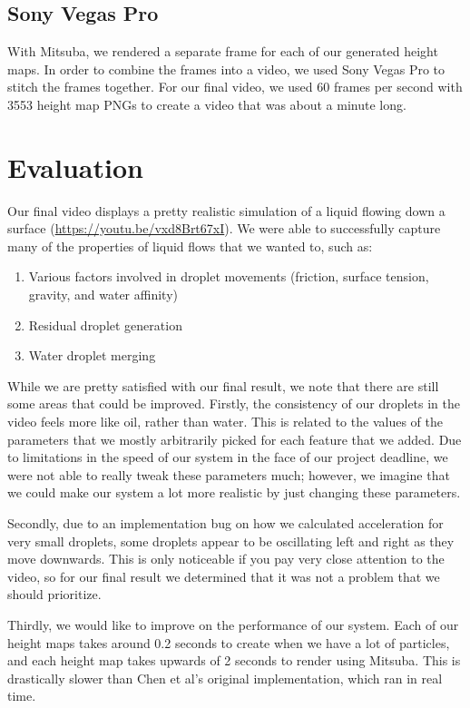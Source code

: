 \documentclass[10pt,twocolumn,letterpaper]{article}
\begin{document}
\subsection{Sony Vegas Pro}

With Mitsuba, we rendered a separate frame for each of our generated height maps. In order to combine the frames into a video, we used Sony Vegas Pro to stitch the frames together. For our final video, we used 60 frames per second with 3553 height map PNGs to create a video that was about a minute long.


\section{Evaluation}

Our final video displays a pretty realistic simulation of a liquid flowing down a surface (\url{https://youtu.be/vxd8Brt67xI}). We were able to successfully capture many of the properties of liquid flows that we wanted to, such as:

\begin{enumerate}
    \item Various factors involved in droplet movements (friction, surface tension, gravity, and water affinity)
    \item Residual droplet generation
    \item Water droplet merging
\end{enumerate}

While we are pretty satisfied with our final result, we note that there are still some areas that could be improved. Firstly, the consistency of our droplets in the video feels more like oil, rather than water. This is related to the values of the parameters that we mostly arbitrarily picked for each feature that we added. Due to limitations in the speed of our system in the face of our project deadline, we were not able to really tweak these parameters much; however, we imagine that we could make our system a lot more realistic by just changing these parameters.

Secondly, due to an implementation bug on how we calculated acceleration for very small droplets, some droplets appear to be oscillating left and right as they move downwards. This is only noticeable if you pay very close attention to the video, so for our final result we determined that it was not a problem that we should prioritize.

Thirdly, we would like to improve on the performance of our system. Each of our height maps takes around 0.2 seconds to create when we have a lot of particles, and each height map takes upwards of 2 seconds to render using Mitsuba. This is drastically slower than Chen et al's original implementation, which ran in real time.
\end{document}
